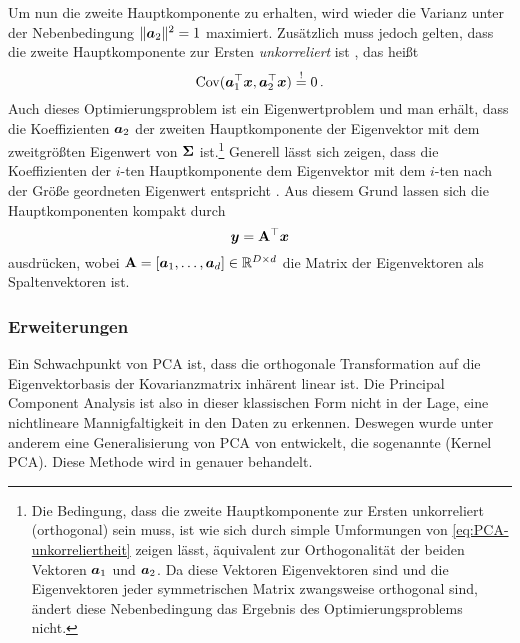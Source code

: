 Um nun die zweite Hauptkomponente zu erhalten, wird wieder die Varianz unter der Nebenbedingung
$\lVert\bm{a}_2\rVert^2 = 1$ maximiert. Zusätzlich muss jedoch gelten, dass die zweite Hauptkomponente
zur Ersten \textit{unkorreliert} ist \parencite[5]{Jolliffe.2002}, das heißt
\begin{equation}
	\label{eq:PCA-unkorreliertheit}
	\operatorname{Cov}(\bm{a}_1^\top\bm{x}, \bm{a}_2^\top\bm{x}) \overset{!}{=} 0 \, .
\end{equation}
Auch dieses Optimierungsproblem ist ein Eigenwertproblem und man erhält, dass die Koeffizienten $\bm{a}_2$ der zweiten Hauptkomponente der Eigenvektor mit dem zweitgrößten Eigenwert von $\mathbf{\Sigma}$ ist.\footnote{Die Bedingung, dass die zweite Hauptkomponente zur Ersten unkorreliert (orthogonal) sein muss, ist wie sich durch simple Umformungen von \eqref{eq:PCA-unkorreliertheit} zeigen lässt, äquivalent zur Orthogonalität der beiden Vektoren $\bm{a}_1$ und $\bm{a}_2$. Da diese Vektoren Eigenvektoren sind und die Eigenvektoren jeder symmetrischen Matrix zwangsweise orthogonal sind, ändert diese Nebenbedingung das Ergebnis des Optimierungsproblems nicht.}
Generell lässt sich zeigen, dass die Koeffizienten der $i$-ten Hauptkomponente dem Eigenvektor mit dem $i$-ten nach der Größe geordneten Eigenwert entspricht \parencite[6]{Jolliffe.2002}. Aus diesem Grund lassen sich die Hauptkomponenten kompakt durch
\begin{equation}
	\bm{y} = \mathbf{A}^\top \bm{x}
\end{equation}
ausdrücken, wobei $\mathbf{A} = [\bm{a}_1,\ldots,\bm{a}_d] \in \mathbb{R}^{D \times d}$ die Matrix der Eigenvektoren als Spaltenvektoren ist.

\subsubsection{Erweiterungen}
\label{ch:MethodenDerDimRed:statistisch:PCA:Erweiterungen}

Ein Schwachpunkt von PCA ist, dass die orthogonale Transformation auf die Eigenvektorbasis der
Kovarianzmatrix inhärent linear ist. Die Principal Component Analysis ist also in dieser
klassischen Form nicht in der Lage, eine nichtlineare Mannigfaltigkeit in den Daten zu erkennen.
Deswegen wurde unter anderem eine Generalisierung von PCA von \textcite{Scholkopf.1997} entwickelt,
die sogenannte  (Kernel PCA). Diese Methode wird in
 genauer behandelt.

